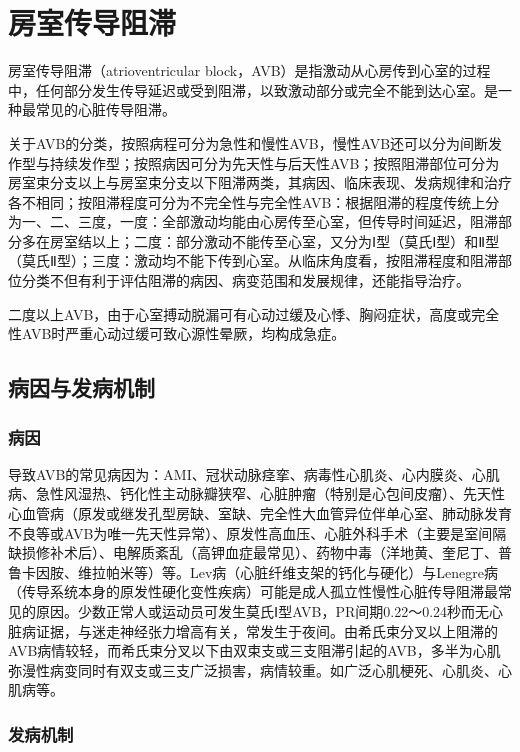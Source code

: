 \section{房室传导阻滞}

房室传导阻滞（atrioventricular
block，AVB）是指激动从心房传到心室的过程中，任何部分发生传导延迟或受到阻滞，以致激动部分或完全不能到达心室。是一种最常见的心脏传导阻滞。

关于AVB的分类，按照病程可分为急性和慢性AVB，慢性AVB还可以分为间断发作型与持续发作型；按照病因可分为先天性与后天性AVB；按照阻滞部位可分为房室束分支以上与房室束分支以下阻滞两类，其病因、临床表现、发病规律和治疗各不相同；按阻滞程度可分为不完全性与完全性AVB：根据阻滞的程度传统上分为一、二、三度，一度：全部激动均能由心房传至心室，但传导时间延迟，阻滞部分多在房室结以上；二度：部分激动不能传至心室，又分为Ⅰ型（莫氏Ⅰ型）和Ⅱ型（莫氏Ⅱ型）；三度：激动均不能下传到心室。从临床角度看，按阻滞程度和阻滞部位分类不但有利于评估阻滞的病因、病变范围和发展规律，还能指导治疗。

二度以上AVB，由于心室搏动脱漏可有心动过缓及心悸、胸闷症状，高度或完全性AVB时严重心动过缓可致心源性晕厥，均构成急症。

\subsection{病因与发病机制}

\subsubsection{病因}

导致AVB的常见病因为：AMI、冠状动脉痉挛、病毒性心肌炎、心内膜炎、心肌病、急性风湿热、钙化性主动脉瓣狭窄、心脏肿瘤（特别是心包间皮瘤）、先天性心血管病（原发或继发孔型房缺、室缺、完全性大血管异位伴单心室、肺动脉发育不良等或AVB为唯一先天性异常）、原发性高血压、心脏外科手术（主要是室间隔缺损修补术后）、电解质紊乱（高钾血症最常见）、药物中毒（洋地黄、奎尼丁、普鲁卡因胺、维拉帕米等）等。Lev病（心脏纤维支架的钙化与硬化）与Lenegre病（传导系统本身的原发性硬化变性疾病）可能是成人孤立性慢性心脏传导阻滞最常见的原因。少数正常人或运动员可发生莫氏Ⅰ型AVB，PR间期0.22～0.24秒而无心脏病证据，与迷走神经张力增高有关，常发生于夜间。由希氏束分叉以上阻滞的AVB病情较轻，而希氏束分叉以下由双束支或三支阻滞引起的AVB，多半为心肌弥漫性病变同时有双支或三支广泛损害，病情较重。如广泛心肌梗死、心肌炎、心肌病等。

\subsubsection{发病机制}

